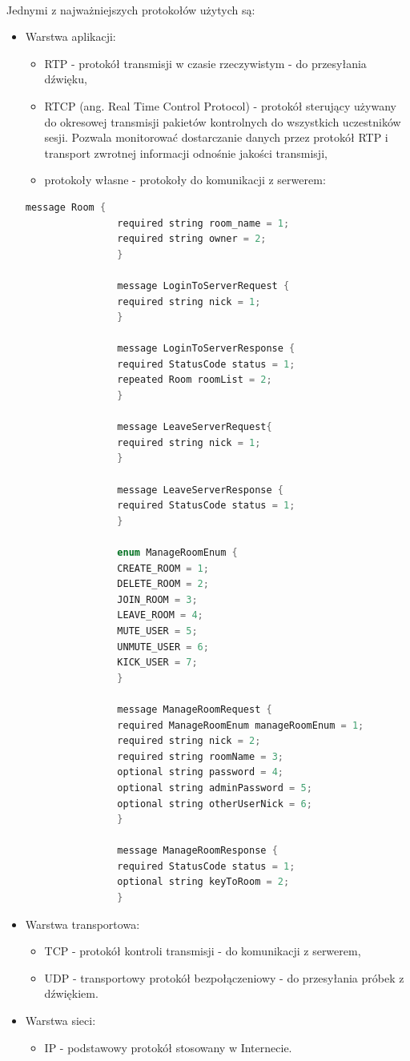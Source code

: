 \documentclass{article}
\begin{document}
	\paragraph*{} Jednymi z najważniejszych protokołów użytych są:
	\begin{itemize}
		\item Warstwa aplikacji:
		\begin{itemize}
			\item RTP - protokół transmisji w czasie rzeczywistym - do przesyłania dźwięku,
			\item RTCP (ang. Real Time Control Protocol) - protokół sterujący używany do okresowej transmisji pakietów kontrolnych do wszystkich uczestników sesji. Pozwala monitorować dostarczanie danych przez protokół RTP i transport zwrotnej informacji odnośnie jakości transmisji,
			\item protokoły własne - protokoły do komunikacji z serwerem:
		\end{itemize}
		\begin{lstlisting}[language=Java]
				message Room {
				required string room_name = 1;
				required string owner = 2;
				}
				
				message LoginToServerRequest {
				required string nick = 1;
				}
				
				message LoginToServerResponse {
				required StatusCode status = 1;
				repeated Room roomList = 2;
				}
				
				message LeaveServerRequest{
				required string nick = 1;
				}
				
				message LeaveServerResponse {
				required StatusCode status = 1;
				}
				
				enum ManageRoomEnum {
				CREATE_ROOM = 1;
				DELETE_ROOM = 2;
				JOIN_ROOM = 3;
				LEAVE_ROOM = 4;
				MUTE_USER = 5;
				UNMUTE_USER = 6;
				KICK_USER = 7;
				}
				
				message ManageRoomRequest {
				required ManageRoomEnum manageRoomEnum = 1;
				required string nick = 2;
				required string roomName = 3;
				optional string password = 4;
				optional string adminPassword = 5;
				optional string otherUserNick = 6;
				}
				
				message ManageRoomResponse {
				required StatusCode status = 1;
				optional string keyToRoom = 2;
				}
				\end{lstlisting}
			
		
		\item Warstwa transportowa:
		\begin{itemize}
			\item TCP - protokół kontroli transmisji - do komunikacji z serwerem,
			\item UDP - transportowy protokół bezpołączeniowy - do przesyłania próbek z dźwiękiem.
		\end{itemize}
		\item Warstwa sieci:
		\begin{itemize}
			\item IP - podstawowy protokół stosowany w Internecie.
		\end{itemize}
	\end{itemize}
\end{document}
